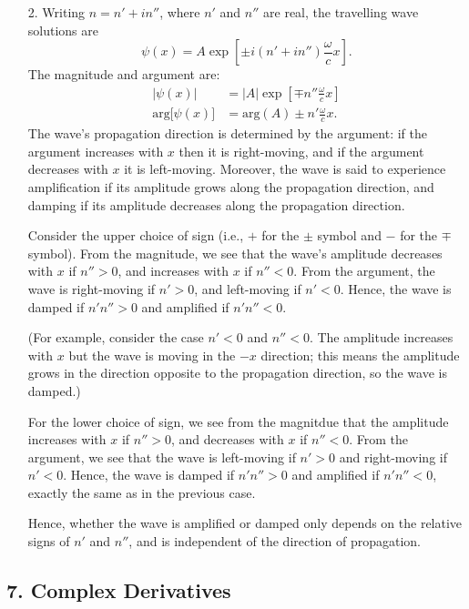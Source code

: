 \documentclass[10pt,a4paper]{article}
\begin{document}
\begin{enumerate}
\item[2.]
Writing $n = n' + i n''$, where $n'$ and $n''$ are real, the
travelling wave solutions are
\begin{equation}
  \psi(x) = A \exp\left[\pm i (n'+in'')\frac{\omega}{c} x\right].
\end{equation}
The magnitude and argument are:
\begin{align}
  \big|\psi(x)\big| &= |A| \exp\left[\mp n'' \frac{\omega}{c} x \right] \\
  \mathrm{arg}\big[\psi(x)\big] &= \mathrm{arg}(A) \pm n' \frac{\omega}{c} x.
\end{align}
The wave's propagation direction is determined by the argument: if the
argument increases with $x$ then it is right-moving, and if the
argument decreases with $x$ it is left-moving. Moreover, the wave is
said to experience amplification if its amplitude grows along the
propagation direction, and damping if its amplitude decreases along the
propagation direction.

Consider the upper choice of sign (i.e., $+$ for the $\pm$ symbol
and $-$ for the $\mp$ symbol). From the magnitude, we see that the
wave's amplitude decreases with $x$ if $n'' > 0$, and increases with
$x$ if $n'' < 0$. From the argument, the wave is right-moving if
$n' >0$, and left-moving if $n' < 0$. Hence, the wave is damped if
$n' n'' >0$ and amplified if $n' n'' < 0$.

(For example, consider the case $n' < 0$ and $n'' < 0$. The
amplitude increases with $x$ but the wave is moving in the $-x$
direction; this means the amplitude grows in the direction opposite to
the propagation direction, so the wave is damped.)

For the lower choice of sign, we see from the magnitdue that the
amplitude increases with $x$ if $n'' > 0$, and decreases with $x$
if $n'' < 0$. From the argument, we see that the wave is left-moving
if $n' >0$ and right-moving if $n' < 0$. Hence, the wave is damped
if $n' n'' >0$ and amplified if $n' n'' < 0$, exactly the same as in
the previous case.

Hence, whether the wave is amplified or damped only depends on the
relative signs of $n'$ and $n''$, and is independent of the
direction of propagation.
\end{enumerate}

\subsection*{7. Complex Derivatives}
\end{document}
